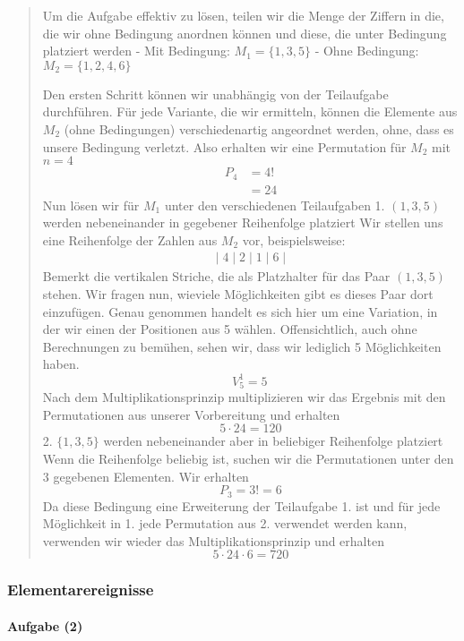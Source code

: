 \documentclass[
]{article}
\begin{document}
\begin{quote}
Um die Aufgabe effektiv zu lösen, teilen wir die Menge der Ziffern in
die, die wir ohne Bedingung anordnen können und diese, die unter
Bedingung platziert werden - Mit Bedingung: \(M_{1} = \{ 1,3,5 \}\) -
Ohne Bedingung: \(M_{2} = \{ 1,2,4,6 \}\)

Den ersten Schritt können wir unabhängig von der Teilaufgabe
durchführen. Für jede Variante, die wir ermitteln, können die Elemente
aus \(M_2\) (ohne Bedingungen) verschiedenartig angeordnet werden, ohne,
dass es unsere Bedingung verletzt. Also erhalten wir eine Permutation
für \(M_2\) mit \(n=4\) \[\begin{align}
P_{4} &= 4! \\
   &= 24
\end{align}\] Nun lösen wir für \(M_1\) unter den verschiedenen
Teilaufgaben 1. \((1,3,5)\) werden nebeneinander in gegebener
Reihenfolge platziert Wir stellen uns eine Reihenfolge der Zahlen aus
\(M_{2}\) vor, beispielsweise: \[\begin{align}
|\; 4 \; | \; 2 \; | \;1\; | \;6\; |   
\end{align}\] Bemerkt die vertikalen Striche, die als Platzhalter für
das Paar \((1,3,5)\) stehen. Wir fragen nun, wieviele Möglichkeiten gibt
es dieses Paar dort einzufügen. Genau genommen handelt es sich hier um
eine Variation, in der wir einen der Positionen aus 5 wählen.
Offensichtlich, auch ohne Berechnungen zu bemühen, sehen wir, dass wir
lediglich 5 Möglichkeiten haben. \[V_{5}^1 = 5\,\]Nach dem
Multiplikationsprinzip multiplizieren wir das Ergebnis mit den
Permutationen aus unserer Vorbereitung und erhalten \[5 \cdot 24 = 120\]
2. \(\{ 1,3,5 \}\) werden nebeneinander aber in beliebiger Reihenfolge
platziert Wenn die Reihenfolge beliebig ist, suchen wir die
Permutationen unter den 3 gegebenen Elementen. Wir erhalten
\[P_{3} = 3! = 6\] Da diese Bedingung eine Erweiterung der Teilaufgabe
1. ist und für jede Möglichkeit in 1. jede Permutation aus 2. verwendet
werden kann, verwenden wir wieder das Multiplikationsprinzip und
erhalten \[5 \cdot 24 \cdot 6 = 720\]
\end{quote}

\subsubsection{Elementarereignisse}\label{elementarereignisse}

\paragraph{Aufgabe (2)}\label{aufgabe-2}
\end{document}
